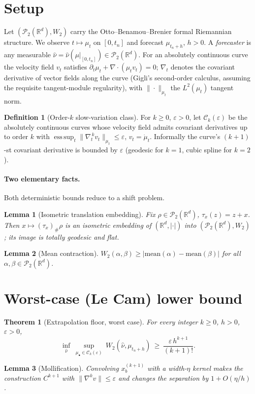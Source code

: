 \documentclass[11pt]{article}
\newtheorem{theorem}{Theorem}
\newtheorem{lemma}{Lemma}
\theoremstyle{definition}
\newtheorem{definition}{Definition}
\theoremstyle{remark}
\newcommand{\R}{\mathbb{R}}
\newcommand{\PP}{\mathcal{P}_2(\R^d)}
\newcommand{\Ck}{\mathcal{C}_k(\varepsilon)}
\newcommand{\mean}{\mathrm{mean}}
\begin{document}
\section{Setup}

Let $(\PP, W_2)$ carry the Otto--Benamou--Brenier formal Riemannian structure. We
observe $t \mapsto \mu_t$ on $[0,t_n]$ and forecast $\mu_{t_n+h}$, $h>0$. A
\emph{forecaster} is any measurable $\hat\nu = \hat\nu(\mu|_{[0,t_n]}) \in \PP$. For
an absolutely continuous curve the velocity field $v_t$ satisfies
$\partial_t \mu_t + \nabla\cdot(\mu_t v_t)=0$; $\nabla_t$ denotes the covariant
derivative of vector fields along the curve (Gigli's second-order calculus, assuming
the requisite tangent-module regularity), with $\|\cdot\|_{\mu_t}$ the $L^2(\mu_t)$
tangent norm.

\begin{definition}[Order-$k$ slow-variation class]\label{def:class}
For $k\ge 0$, $\varepsilon>0$, let $\Ck$ be the absolutely continuous curves whose
velocity field admits covariant derivatives up to order $k$ with
$\operatorname*{ess\,sup}_{t}\| \nabla_t^{\,k} v_t\|_{\mu_t}\le \varepsilon$,
$v_t=\dot\mu_t$. Informally the curve's $(k{+}1)$-st covariant derivative is bounded
by $\varepsilon$ (geodesic for $k{=}1$, cubic spline for $k{=}2$).
\end{definition}

\paragraph{Two elementary facts.} Both deterministic bounds reduce to a shift problem.

\begin{lemma}[Isometric translation embedding]\label{lem:embed}
Fix $\rho\in\PP$, $\tau_x(z)=z+x$. Then $x \mapsto (\tau_x)_\#\rho$ is an isometric
embedding of $(\R^d,|\cdot|)$ into $(\PP,W_2)$; its image is totally geodesic and flat.
\end{lemma}

\begin{lemma}[Mean contraction]\label{lem:mean}
$W_2(\alpha,\beta)\ge|\mean(\alpha)-\mean(\beta)|$ for all $\alpha,\beta\in\PP$.
\end{lemma}

\section{Worst-case (Le Cam) lower bound}

\begin{theorem}[Extrapolation floor, worst case]\label{thm:lecam}
For every integer $k\ge 0$, $h>0$, $\varepsilon>0$,
\[
  \inf_{\hat\nu}\ \sup_{\mu_\bullet\in\Ck}\ W_2(\hat\nu,\mu_{t_n+h})\ \ge\ \frac{\varepsilon\,h^{k+1}}{(k+1)!}.
\]
\end{theorem}
\begin{lemma}[Mollification]\label{lem:moll}
Convolving $x_b^{(k+1)}$ with a width-$\eta$ kernel makes the construction $C^{k+1}$
with $\|\nabla^k v\|\le\varepsilon$ and changes the separation by $1+O(\eta/h)$.
\end{lemma}
\end{document}
